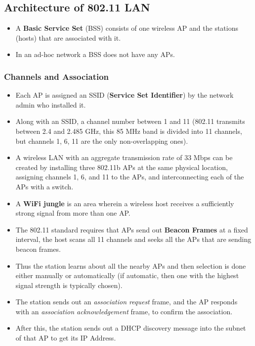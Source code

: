 \documentclass[a4paper]{article}
\theoremstyle{plain}
\theoremstyle{definition}
\begin{document}
\subsection{Architecture of 802.11 LAN}
\begin{itemize}
    \item A \textbf{Basic Service Set} (BSS) consists of one wireless AP and the stations (hosts) that are associated with it. 
    
    \item In an ad-hoc network a BSS does not have any APs. 
\end{itemize}

\subsubsection{Channels and Association}
\begin{itemize}
    \item Each AP is assigned an SSID (\textbf{Service Set Identifier}) by the network admin who installed it. 
    
    \item Along with an SSID, a channel number between 1 and 11 (802.11 transmits between 2.4 and 2.485 GHz, this 85 MHz band is divided into 11 channels, but channels 1, 6, 11 are the only non-overlapping ones). 
    
    \item A wireless LAN with an aggregate transmission rate of 33 Mbps can be created by installing three 802.11b APs at the same physical location, assigning channels 1, 6, and 11 to the APs, and interconnecting each of the APs with a switch.
    
    \item A \textbf{WiFi jungle} is an area wherein a wireless host receives a sufficiently strong signal from more than one AP. 
    
    \item The 802.11 standard requires that APs send out \textbf{Beacon Frames} at a fixed interval, the host scans all 11 channels and seeks all the APs that are sending beacon frames. 
    \item Thus the station learns about all the nearby APs and then selection is done either manually or automatically (if automatic, then one with the highest signal strength is typically chosen). 

    \item The station sends out an \textit{association request} frame, and the AP responds with an \textit{association acknowledgement} frame, to confirm the association. 
    
    \item After this, the station sends out a DHCP discovery message into the subnet of that AP to get its IP Address. 
\end{itemize}
\end{document}
